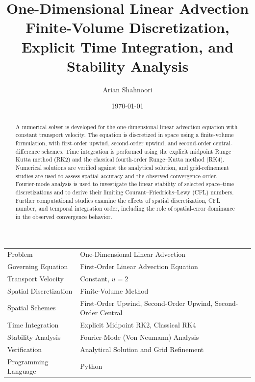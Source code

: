 \documentclass[11pt,a4paper]{article}
\title{
    \Huge\textbf{One-Dimensional Linear Advection}\\[0.4cm]
    \Large
    Finite-Volume Discretization, Explicit Time Integration, and Stability Analysis
}
\author{
    \Large Arian Shahnoori
}
\date{\today}
\begin{document}

\maketitle
\thispagestyle{empty}

\vspace{0.8cm}

\begin{abstract}
A numerical solver is developed for the one-dimensional linear advection equation with constant transport velocity. The equation is discretized in space using a finite-volume formulation, with first-order upwind, second-order upwind, and second-order central-difference schemes. Time integration is performed using the explicit midpoint Runge--Kutta method (RK2) and the classical fourth-order Runge--Kutta method (RK4). Numerical solutions are verified against the analytical solution, and grid-refinement studies are used to assess spatial accuracy and the observed convergence order. Fourier-mode analysis is used to investigate the linear stability of selected space--time discretizations and to derive their limiting Courant--Friedrichs--Lewy (CFL) numbers. Further computational studies examine the effects of spatial discretization, CFL number, and temporal integration order, including the role of spatial-error dominance in the observed convergence behavior.
\end{abstract}

\vspace{0.5cm}

\begin{center}
\renewcommand{\arraystretch}{1.15}
\begin{tabular}{p{} p{}}
\toprule
Problem & One-Dimensional Linear Advection \\
Governing Equation & First-Order Linear Advection Equation \\
Transport Velocity & Constant, $u=2$ \\
Spatial Discretization & Finite-Volume Method \\
Spatial Schemes & First-Order Upwind, Second-Order Upwind, Second-Order Central \\
Time Integration & Explicit Midpoint RK2, Classical RK4 \\
Stability Analysis & Fourier-Mode (Von Neumann) Analysis \\
Verification & Analytical Solution and Grid Refinement \\
Programming Language & Python \\
\bottomrule
\end{tabular}
\end{center}
\end{document}
